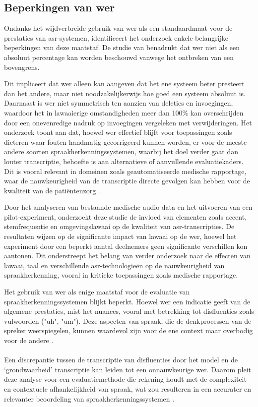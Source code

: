 \subsection{Beperkingen van \gls{wer}}
 Ondanks het wijdverbreide gebruik van \gls{wer} als een standaardmaat voor de prestaties van \gls{asr}-systemen, identificeert het onderzoek enkele belangrijke beperkingen van deze maatstaf. De studie van \textcite{Kwint2023} benadrukt dat \gls{wer} niet als een absoluut percentage kan worden beschouwd vanwege het ontbreken van een bovengrens. 
 
 Dit impliceert dat \gls{wer} alleen kan aangeven dat het ene systeem beter presteert dan het andere, maar niet noodzakelijkerwijs hoe goed een systeem absoluut is. Daarnaast is \gls{wer} niet symmetrisch ten aanzien van deleties en invoegingen, waardoor het in lawaaierige omstandigheden meer dan 100\% kan overschrijden door een onevenredige nadruk op invoegingen vergeleken met verwijderingen. Het onderzoek toont aan dat, hoewel \gls{wer} effectief blijft voor toepassingen zoals dicteren waar fouten handmatig gecorrigeerd kunnen worden, er voor de meeste andere soorten spraakherkenningssystemen, waarbij het doel verder gaat dan louter transcriptie, behoefte is aan alternatieve of aanvullende evaluatiekaders. Dit is vooral relevant in domeinen zoals geautomatiseerde medische rapportage, waar de nauwkeurigheid van de transcriptie directe gevolgen kan hebben voor de kwaliteit van de patiëntenzorg \autocite{Kwint2023}.

Door het analyseren van bestaande medische audio-data en het uitvoeren van een pilot-experiment, onderzoekt deze studie de invloed van elementen zoals accent, stemfrequentie en omgevingslawaai op de kwaliteit van \gls{asr}-transcripties. De resultaten wijzen op de significante impact van lawaai op de \gls{wer}, hoewel het experiment door een beperkt aantal deelnemers geen significante verschillen kon aantonen. Dit onderstreept het belang van verder onderzoek naar de effecten van lawaai, taal en verschillende \gls{asr}-technologieën op de nauwkeurigheid van spraakherkenning, vooral in kritieke toepassingen zoals medische rapportage.

Het gebruik van \gls{wer} als enige maatstaf voor de evaluatie van spraakherkenningssystemen blijkt beperkt. Hoewel \gls{wer} een indicatie geeft van de algemene prestaties, mist het nuances, vooral met betrekking tot disfluenties zoals vulwoorden ("uh", "um"). Deze aspecten van spraak, die de denkprocessen van de spreker weerspiegelen, kunnen waardevol zijn voor de ene context maar overbodig voor de andere \textcite{Kwint2023}.
\\
\\
Een discrepantie tussen de transcriptie van disfluenties door het model en de ‘grondwaarheid’ transcriptie kan leiden tot een onnauwkeurige \gls{wer}. Daarom pleit deze analyse voor een evaluatiemethode die rekening houdt met de complexiteit en contextuele afhankelijkheid van spraak, wat zou resulteren in een accurater en relevanter beoordeling van spraakherkenningssystemen \autocite{OConnor2023}.

